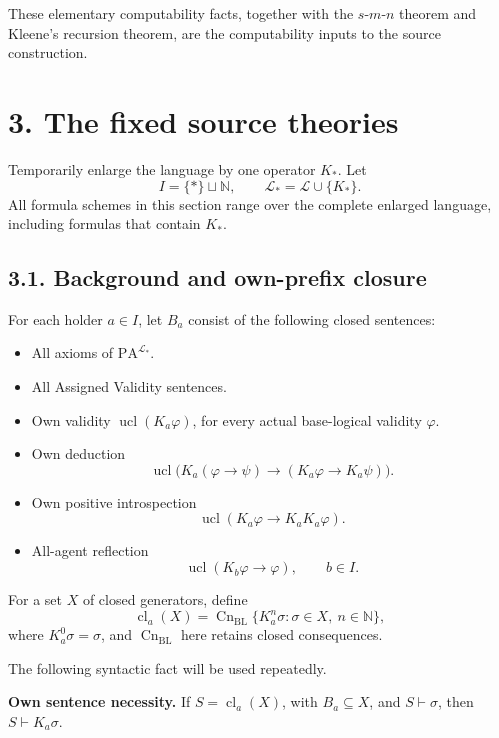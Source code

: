 \documentclass[
  11pt,
  letterpaper,
]{article}
\providecommand{\tightlist}{%
  \setlength{\itemsep}{0pt}\setlength{\parskip}{0pt}}
\begin{document}
These elementary computability facts, together with the
\(s\)-\(m\)-\(n\) theorem and Kleene's recursion theorem, are the
computability inputs to the source construction.

\section{3. The fixed source theories}\label{the-fixed-source-theories}

Temporarily enlarge the language by one operator \(K_*\). Let \[
I=\{*\}\sqcup\mathbb N,\qquad \mathcal L_*=\mathcal L\cup\{K_*\}.
\] All formula schemes in this section range over the complete enlarged
language, including formulas that contain \(K_*\).

\subsection{3.1. Background and own-prefix
closure}\label{background-and-own-prefix-closure}

For each holder \(a\in I\), let \(B_a\) consist of the following closed
sentences:

\begin{itemize}
\tightlist
\item
  All axioms of \(\mathrm{PA}^{\mathcal L_*}\).
\item
  All Assigned Validity sentences.
\item
  Own validity \(\operatorname{ucl}(K_a\varphi)\), for every actual
  base-logical validity \(\varphi\).
\item
  Own deduction \[
  \operatorname{ucl}\bigl(K_a(\varphi\to\psi)
       \to(K_a\varphi\to K_a\psi)\bigr).
  \]
\item
  Own positive introspection \[
  \operatorname{ucl}(K_a\varphi\to K_aK_a\varphi).
  \]
\item
  All-agent reflection \[
  \operatorname{ucl}(K_b\varphi\to\varphi),\qquad b\in I.
  \]
\end{itemize}

For a set \(X\) of closed generators, define \[
\operatorname{cl}_a(X)=
\operatorname{Cn}_{\mathrm{BL}}
 \{K_a^n\sigma:\sigma\in X,\ n\in\mathbb N\},
\tag{S1}
\] where \(K_a^0\sigma=\sigma\), and \(\operatorname{Cn}_{\mathrm{BL}}\)
here retains closed consequences.

The following syntactic fact will be used repeatedly.

\textbf{Own sentence necessity.} If \(S=\operatorname{cl}_a(X)\), with
\(B_a\subseteq X\), and \(S\vdash\sigma\), then \(S\vdash K_a\sigma\).
\end{document}
